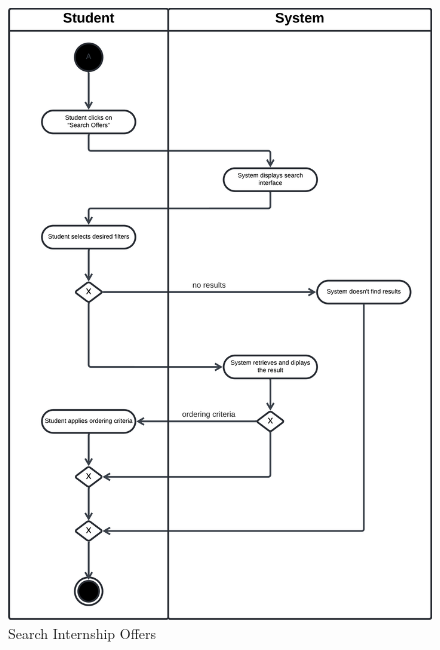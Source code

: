 \begin{figure}[H]
    \begin{center}
         \includegraphics[width=1\linewidth]{LaTeXCode/images/activity diagram/UC8.png}
         \caption{Search Internship Offers}
         \label{fig:search_offer_ad}
     \end{center}
\end{figure}

\newpage

